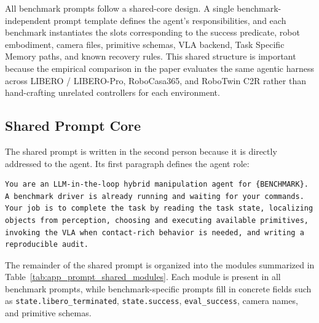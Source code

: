 \documentclass[11pt]{article}
\begin{document}
All benchmark prompts follow a shared-core design. A single benchmark-independent
prompt template defines the agent's responsibilities, and each benchmark instantiates
the slots corresponding to the success predicate, robot embodiment, camera files,
primitive schemas, VLA backend, Task Specific Memory paths, and known recovery rules. This shared
structure is important because the empirical comparison in the paper evaluates the
same agentic harness across LIBERO / LIBERO-Pro, RoboCasa365, and RoboTwin C2R rather
than hand-crafting unrelated controllers for each environment.

\subsection{Shared Prompt Core}
\label{app:agent_prompt:shared}

The shared prompt is written in the second person because it is directly addressed to
the agent. Its first paragraph defines the agent role:

\begin{lstlisting}[frame=single,framerule=0.5pt]
You are an LLM-in-the-loop hybrid manipulation agent for {BENCHMARK}.
A benchmark driver is already running and waiting for your commands.
Your job is to complete the task by reading the task state, localizing
objects from perception, choosing and executing available primitives,
invoking the VLA when contact-rich behavior is needed, and writing a
reproducible audit.
\end{lstlisting}

The remainder of the shared prompt is organized into the modules summarized in
Table~\ref{tab:app_prompt_shared_modules}. Each module is present in all benchmark
prompts, while benchmark-specific prompts fill in concrete fields such as
\texttt{state.libero\_terminated}, \texttt{state.success}, \texttt{eval\_success},
camera names, and primitive schemas.
\end{document}
